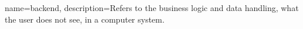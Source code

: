 {
    name=backend,
    description={Refers to the business logic and data handling, what the user does not see, in a computer system.}
}
